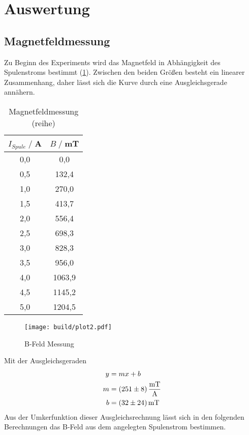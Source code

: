 \section{Auswertung}

\subsection{Magnetfeldmessung}
Zu Beginn des Experiments wird das Magnetfeld in Abhängigkeit des Spulenstroms bestimmt (\ref{tab:Br}).
Zwischen den beiden Größen besteht ein linearer Zusammenhang, daher lässt sich die Kurve durch eine Ausgleichsgerade annähern.
\begin{table}[H]
    \centering
    \begin{tabular}{c c}
        \toprule
        $I_{Spule} \;/\;$A & $B\;/\;$mT\\
        \midrule
        0,0                 &0,0\\
        0,5                 &132,4\\
        1,0                 &270,0\\
        1,5                 &413,7\\
        2,0                 &556,4\\  
        2,5                 &698,3\\
        3,0                 &828,3\\
        3,5                 &956,0\\
        4,0                 &1063,9\\
        4,5                 &1145,2\\
        5,0                 &1204,5\\
        \bottomrule
    \end{tabular}
    \caption{Magnetfeldmessung (reihe)}
    \label{tab:Br}
\end{table}
\begin{figure}[H]
    \centering
    \texttt{[image: build/plot2.pdf]}
    \caption{B-Feld Messung}
    \label{fig:Br}
\end{figure}
Mit der Ausgleichsgeraden
\begin{align*}
    y &= mx + b\\
    m &= \SI{251\pm 8}{\milli \tesla \per \ampere} \\  
    b &= \SI{32\pm 24}{\milli \tesla}\\
\end{align*}
Aus der Umkerfunktion dieser Ausgleichsrechnung lässt sich in den folgenden Berechnungen das B-Feld aus dem angelegten Spulenstrom bestimmen.

